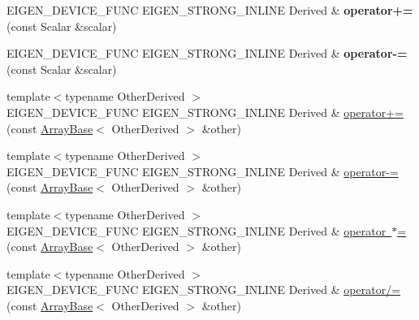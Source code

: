 \begin{DoxyCompactItemize}
\mbox{\label{class_eigen_1_1_array_base_a2f2c3809c1c6463cb25939264c68a769}} 
E\+I\+G\+E\+N\+\_\+\+D\+E\+V\+I\+C\+E\+\_\+\+F\+U\+NC E\+I\+G\+E\+N\+\_\+\+S\+T\+R\+O\+N\+G\+\_\+\+I\+N\+L\+I\+NE Derived \& {\bfseries operator+=} (const Scalar \&scalar)
\item 
\mbox{\label{class_eigen_1_1_array_base_a4cac3e74ea7d5b36e256582fd207df1e}} 
E\+I\+G\+E\+N\+\_\+\+D\+E\+V\+I\+C\+E\+\_\+\+F\+U\+NC E\+I\+G\+E\+N\+\_\+\+S\+T\+R\+O\+N\+G\+\_\+\+I\+N\+L\+I\+NE Derived \& {\bfseries operator-\/=} (const Scalar \&scalar)
\item 
{\footnotesize template$<$typename Other\+Derived $>$ }\\E\+I\+G\+E\+N\+\_\+\+D\+E\+V\+I\+C\+E\+\_\+\+F\+U\+NC E\+I\+G\+E\+N\+\_\+\+S\+T\+R\+O\+N\+G\+\_\+\+I\+N\+L\+I\+NE Derived \& \mbox{\hyperlink{class_eigen_1_1_array_base_ab4bac4291bfd0da16f768d32398e7752}{operator+=}} (const \mbox{\hyperlink{class_eigen_1_1_array_base}{Array\+Base}}$<$ Other\+Derived $>$ \&other)
\item 
{\footnotesize template$<$typename Other\+Derived $>$ }\\E\+I\+G\+E\+N\+\_\+\+D\+E\+V\+I\+C\+E\+\_\+\+F\+U\+NC E\+I\+G\+E\+N\+\_\+\+S\+T\+R\+O\+N\+G\+\_\+\+I\+N\+L\+I\+NE Derived \& \mbox{\hyperlink{class_eigen_1_1_array_base_a6648eeebc4a9d407605410a7149f1a93}{operator-\/=}} (const \mbox{\hyperlink{class_eigen_1_1_array_base}{Array\+Base}}$<$ Other\+Derived $>$ \&other)
\item 
{\footnotesize template$<$typename Other\+Derived $>$ }\\E\+I\+G\+E\+N\+\_\+\+D\+E\+V\+I\+C\+E\+\_\+\+F\+U\+NC E\+I\+G\+E\+N\+\_\+\+S\+T\+R\+O\+N\+G\+\_\+\+I\+N\+L\+I\+NE Derived \& \mbox{\hyperlink{class_eigen_1_1_array_base_a692a601054a505dce15bb5dd353e7923}{operator $\ast$=}} (const \mbox{\hyperlink{class_eigen_1_1_array_base}{Array\+Base}}$<$ Other\+Derived $>$ \&other)
\item 
{\footnotesize template$<$typename Other\+Derived $>$ }\\E\+I\+G\+E\+N\+\_\+\+D\+E\+V\+I\+C\+E\+\_\+\+F\+U\+NC E\+I\+G\+E\+N\+\_\+\+S\+T\+R\+O\+N\+G\+\_\+\+I\+N\+L\+I\+NE Derived \& \mbox{\hyperlink{class_eigen_1_1_array_base_a91860c840ac453449c1ac65fc61065f8}{operator/=}} (const \mbox{\hyperlink{class_eigen_1_1_array_base}{Array\+Base}}$<$ Other\+Derived $>$ \&other)
\item 
\mbox{\label{class_eigen_1_1_array_base_af65212900e3c7d36abd2c2b04e550a3c}} 

\end{DoxyCompactItemize}
